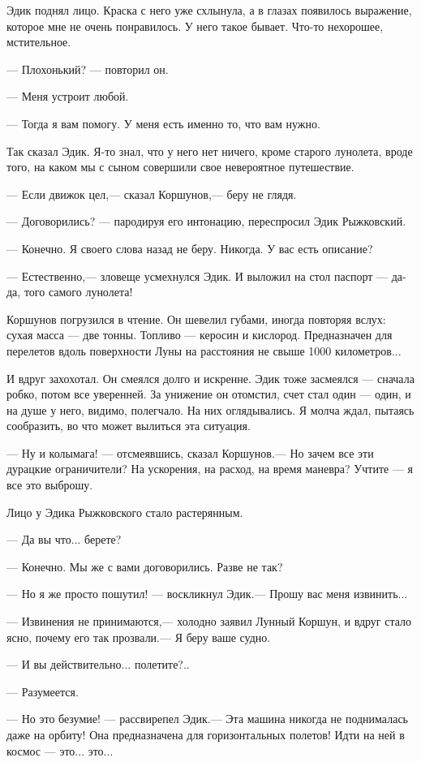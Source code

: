 \documentclass[11pt,a4paper,oneside]{article}
\begin{document}
Эдик поднял лицо. Краска с него уже схлынула, а в глазах появилось выражение, которое мне не очень понравилось. У него такое бывает. Что-то нехорошее, мстительное.

— Плохонький? — повторил он.

— Меня устроит любой.

— Тогда я вам помогу. У меня есть именно то, что вам нужно.

Так сказал Эдик. Я-то знал, что у него нет ничего, кроме старого лунолета, вроде того, на каком мы с сыном совершили свое невероятное путешествие.

— Если движок цел,— сказал Коршунов,— беру не глядя.

— Договорились? — пародируя его интонацию, переспросил Эдик Рыжковский.

— Конечно. Я своего слова назад не беру. Никогда. У вас есть описание?

— Естественно,— зловеще усмехнулся Эдик. И выложил на стол паспорт — да-да, того самого лунолета!

Коршунов погрузился в чтение. Он шевелил губами, иногда повторяя вслух: сухая масса — две тонны. Топливо — керосин и кислород. Предназначен для перелетов вдоль поверхности Луны на расстояния не свыше 1000 километров...

И вдруг захохотал. Он смеялся долго и искренне. Эдик тоже засмеялся — сначала робко, потом все уверенней. За унижение он отомстил, счет стал один — один, и на душе у него, видимо, полегчало. На них оглядывались. Я молча ждал, пытаясь сообразить, во что может вылиться эта ситуация.

— Ну и колымага! — отсмеявшись, сказал Коршунов.— Но зачем все эти дурацкие ограничители? На ускорения, на расход, на время маневра? Учтите — я все это выброшу.

Лицо у Эдика Рыжковского стало растерянным.

— Да вы что... берете?

— Конечно. Мы же с вами договорились. Разве не так?

— Но я же просто пошутил! — воскликнул Эдик.— Прошу вас меня извинить...

— Извинения не принимаются,— холодно заявил Лунный Коршун, и вдруг стало ясно, почему его так прозвали.— Я беру ваше судно.

— И вы действительно... полетите?..

— Разумеется.

— Но это безумие! — рассвирепел Эдик.— Эта машина никогда не поднималась даже на орбиту! Она предназначена для горизонтальных полетов! Идти на ней в космос — это... это...
\end{document}
